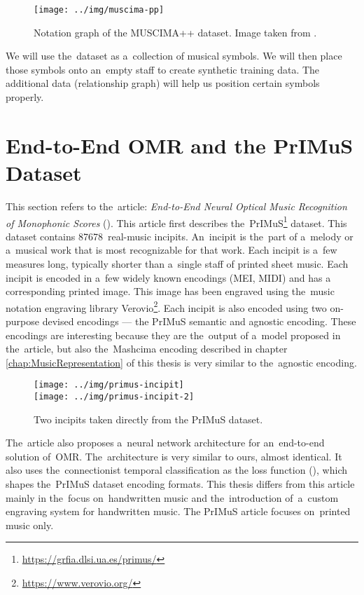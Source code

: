 \begin{figure}[h]
    \centering
    \texttt{[image: ../img/muscima-pp]}
    \caption{Notation graph of the MUSCIMA++ dataset. Image taken from \cite{MuscimaPP}.}
    \label{fig2:MuscimaPP}
\end{figure}

We will use the~dataset as a~collection of musical symbols. We will then place those symbols onto an~empty staff to create synthetic training data. The additional data (relationship graph) will help us position certain symbols properly.


\section{End-to-End OMR and the PrIMuS Dataset}

This section refers to the~article: \emph{End-to-End Neural Optical Music Recognition of Monophonic Scores} (\cite{Primus}). This article first describes the~PrIMuS\footnote{\href{https://grfia.dlsi.ua.es/primus/}{https://grfia.dlsi.ua.es/primus/}} dataset. This dataset contains 87678~real-music incipits. An~incipit is the~part of a~melody or a~musical work that is most recognizable for that work. Each incipit is a~few measures long, typically shorter than a~single staff of printed sheet music. Each incipit is encoded in a~few widely known encodings (MEI, MIDI) and has a corresponding printed image. This image has been engraved using the~music notation engraving library Verovio\footnote{\href{https://www.verovio.org/}{https://www.verovio.org/}}. Each incipit is also encoded using two on-purpose devised encodings --- the PrIMuS semantic and agnostic encoding. These encodings are interesting because they are the~output of a~model proposed in the~article, but also the~Mashcima encoding described in chapter \ref{chap:MusicRepresentation} of this thesis is very similar to the~agnostic encoding.

\begin{figure}[h]
    \centering
    \texttt{[image: ../img/primus-incipit]}
    \\
    \medskip
    \texttt{[image: ../img/primus-incipit-2]}
    \caption{Two incipits taken directly from the PrIMuS dataset.}
    \label{fig2:PrimusIncipits}
\end{figure}

The~article also proposes a~neural network architecture for an~end-to-end solution of~OMR. The~architecture is very similar to ours, almost identical. It also uses the~connectionist temporal classification as the loss function (\cite{CTC}), which shapes the~PrIMuS dataset encoding formats. This thesis differs from this article mainly in the~focus on~handwritten music and the~introduction of~a~custom engraving system for handwritten music. The PrIMuS article focuses on~printed music only.

